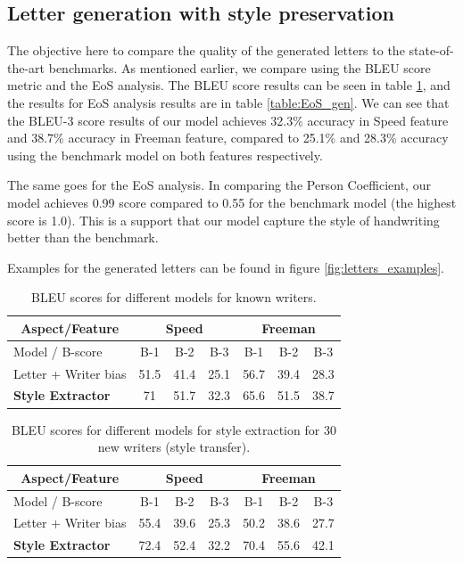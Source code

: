   \subsection{Letter generation with style preservation}
  \par The objective here to compare the quality of the generated letters to the state-of-the-art benchmarks. As mentioned earlier, we compare using the BLEU score metric and the EoS analysis.
  The BLEU score results can be seen in table \ref{table:bleu_gen}, and the results for EoS analysis results are in table \ref{table:EoS_gen}. We can see that the BLEU-3 score results of our model achieves 32.3\% accuracy in Speed feature and 38.7\% accuracy in Freeman feature, compared to 25.1\% and 28.3\% accuracy using the benchmark model on both features respectively.
  \par The same goes for the EoS analysis. In comparing the Person Coefficient, our model achieves 0.99 score compared to 0.55 for the benchmark model (the highest score is 1.0). This is a support that our model capture the style of handwriting better than the benchmark.
  \par Examples for the generated letters can be found in figure \ref{fig:letters_examples}.


  \begin{table}[!htbp]
  \centering
  \begin{tabular}{|l||c|c|c||c|c|c|}
  \hline
  \multicolumn{1}{|c||}{Aspect/Feature} & \multicolumn{3}{c||}{ Speed } & \multicolumn{3}{c|}{ Freeman }   \\ \hline
  Model / B-score      & B-1  & B-2  & B-3           & B-1  & B-2   & B-3              \\ \hline
  Letter + Writer bias & 51.5 & 41.4 & 25.1          & 56.7 & 39.4  & 28.3             \\\hline
  \textbf{Style Extractor} & 71 & 51.7 & 32.3 & 65.6 & 51.5 & 38.7 \\\hline
  \end{tabular}
  \caption{BLEU scores for different models for known writers.}
  \label{table:bleu_gen}
  \end{table}

  \begin{table}[!htbp]
  \centering
  \begin{tabular}{|l||c|c|c||c|c|c|}
  \hline
  \multicolumn{1}{|c||}{Aspect/Feature} & \multicolumn{3}{c||}{ Speed } & \multicolumn{3}{c|}{ Freeman }   \\ \hline
  Model / B-score      & B-1  & B-2  & B-3           & B-1  & B-2   & B-3              \\ \hline
  Letter + Writer bias & 55.4 & 39.6 & 25.3 & 50.2 & 38.6 & 27.7             \\\hline
  \textbf{Style Extractor} & 72.4 & 52.4 & 32.2 & 70.4 & 55.6 & 42.1 \\\hline

  \end{tabular}
  \caption{BLEU scores for different models for style extraction for 30 new writers (style transfer).}
  \label{table:bleu_transfer}
  \end{table}

